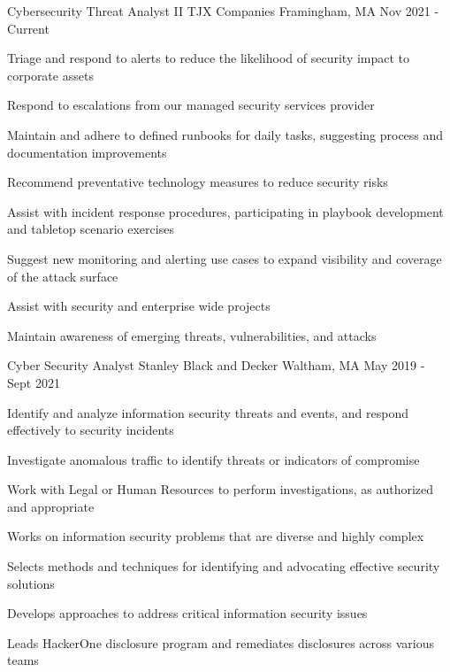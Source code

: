 
\begin{cventries}
  \cventry
    {Cybersecurity Threat Analyst II} %
    {TJX Companies} %
    {Framingham, MA} %
    {Nov 2021 - Current} %
    {
      \begin{cvitems} %
        \item {Triage and respond to alerts to reduce the likelihood of security impact to corporate assets}
        \item {Respond to escalations from our managed security services provider}
        \item {Maintain and adhere to defined runbooks for daily tasks, suggesting process and documentation improvements}
        \item {Recommend preventative technology measures to reduce security risks}
        \item {Assist with incident response procedures, participating in playbook development and tabletop scenario exercises}
        \item {Suggest new monitoring and alerting use cases to expand visibility and coverage of the attack surface}
        \item {Assist with security and enterprise wide projects}
        \item {Maintain awareness of emerging threats, vulnerabilities, and attacks}
      \end{cvitems}
    }

  \cventry
    {Cyber Security Analyst} %
    {Stanley Black and Decker} %
    {Waltham, MA} %
    {May 2019 - Sept 2021} %
    {
      \begin{cvitems} %
        \item {Identify and analyze information security threats and events, and respond effectively to security incidents}
        \item {Investigate anomalous traffic to identify threats or indicators of compromise}
        \item {Work with Legal or Human Resources to perform investigations, as authorized and appropriate}
        \item {Works on information security problems that are diverse and highly complex}
        \item {Selects methods and techniques for identifying and advocating effective security solutions}
        \item {Develops approaches to address critical information security issues}
        \item {Leads HackerOne disclosure program and remediates disclosures across various teams}
      \end{cvitems}
    }


\end{cventries}
